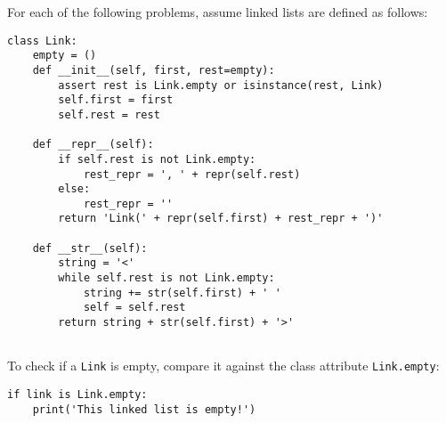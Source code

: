 \begin{blocksection}
\vspace{1mm}
For each of the following problems, assume linked lists are defined as follows:
\newline
\begin{lstlisting}
class Link:
    empty = ()
    def __init__(self, first, rest=empty):
        assert rest is Link.empty or isinstance(rest, Link)
        self.first = first
        self.rest = rest

    def __repr__(self):
        if self.rest is not Link.empty:
            rest_repr = ', ' + repr(self.rest)
        else:
            rest_repr = ''
        return 'Link(' + repr(self.first) + rest_repr + ')'

    def __str__(self):
        string = '<'
        while self.rest is not Link.empty:
            string += str(self.first) + ' '
            self = self.rest
        return string + str(self.first) + '>'
        
\end{lstlisting}
\vspace{\baselineskip}
To check if a \texttt{Link} is empty, compare it against the class attribute \texttt{Link.empty}:
\newline
\begin{lstlisting}
if link is Link.empty:
    print('This linked list is empty!')
\end{lstlisting}
\end{blocksection}
